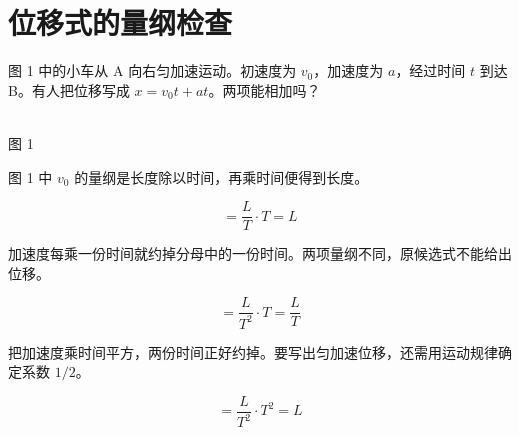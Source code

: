 \documentclass[UTF8,fontset=fandol]{ctexart}
\begin{document}
\section*{位移式的量纲检查}

图 1 中的小车从 A 向右匀加速运动。初速度为 $v_0$，加速度为 $a$，经过时间 $t$ 到达 B。有人把位移写成 $x=v_0t+at$。两项能相加吗？

\begin{center}\\ 图 1\end{center}

图 1 中 $v_0$ 的量纲是长度除以时间，再乘时间便得到长度。

\begin{equation}[v_0t]=\frac{L}{T}\cdot T=L\label{eq:length-from-speed}\end{equation}

加速度每乘一份时间就约掉分母中的一份时间。两项量纲不同，原候选式不能给出位移。

\begin{equation}[at]=\frac{L}{T^2}\cdot T=\frac{L}{T}\label{eq:speed-from-acceleration}\end{equation}

把加速度乘时间平方，两份时间正好约掉。要写出匀加速位移，还需用运动规律确定系数 $1/2$。

\begin{equation}[at^2]=\frac{L}{T^2}\cdot T^2=L\label{eq:length-from-acceleration}\end{equation}
\end{document}

